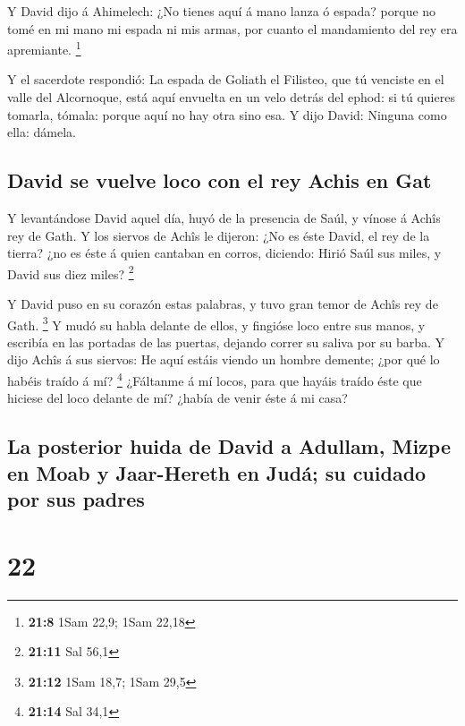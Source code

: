 Y David dijo á Ahimelech: ¿No tienes aquí á mano lanza ó
espada? porque no tomé en mi mano mi espada ni mis armas, por cuanto el
mandamiento del rey era apremiante. \footnote{\textbf{21:8} 1Sam 22,9;
  1Sam 22,18}

 Y el sacerdote respondió: La espada de Goliath el
Filisteo, que tú venciste en el valle del Alcornoque, está aquí envuelta
en un velo detrás del ephod: si tú quieres tomarla, tómala: porque aquí
no hay otra sino esa. Y dijo David: Ninguna como ella: dámela.

\hypertarget{david-se-vuelve-loco-con-el-rey-achis-en-gat}{%
\subsection{David se vuelve loco con el rey Achis en
Gat}\label{david-se-vuelve-loco-con-el-rey-achis-en-gat}}

 Y levantándose David aquel día, huyó de la presencia de
Saúl, y vínose á Achîs rey de Gath.  Y los siervos de
Achîs le dijeron: ¿No es éste David, el rey de la tierra? ¿no es éste á
quien cantaban en corros, diciendo: Hirió Saúl sus miles, y David sus
diez miles? \footnote{\textbf{21:11} Sal 56,1}

 Y David puso en su corazón estas palabras, y tuvo gran
temor de Achîs rey de Gath. \footnote{\textbf{21:12} 1Sam 18,7; 1Sam
  29,5}  Y mudó su habla delante de ellos, y fingióse
loco entre sus manos, y escribía en las portadas de las puertas, dejando
correr su saliva por su barba.  Y dijo Achîs á sus
siervos: He aquí estáis viendo un hombre demente; ¿por qué lo habéis
traído á mí? \footnote{\textbf{21:14} Sal 34,1} 
¿Fáltanme á mí locos, para que hayáis traído éste que hiciese del loco
delante de mí? ¿había de venir éste á mi casa?

\hypertarget{la-posterior-huida-de-david-a-adullam-mizpe-en-moab-y-jaar-hereth-en-juduxe1-su-cuidado-por-sus-padres}{%
\subsection{La posterior huida de David a Adullam, Mizpe en Moab y
Jaar-Hereth en Judá; su cuidado por sus
padres}\label{la-posterior-huida-de-david-a-adullam-mizpe-en-moab-y-jaar-hereth-en-juduxe1-su-cuidado-por-sus-padres}}

\hypertarget{section-21}{%
\section{22}\label{section-21}}

